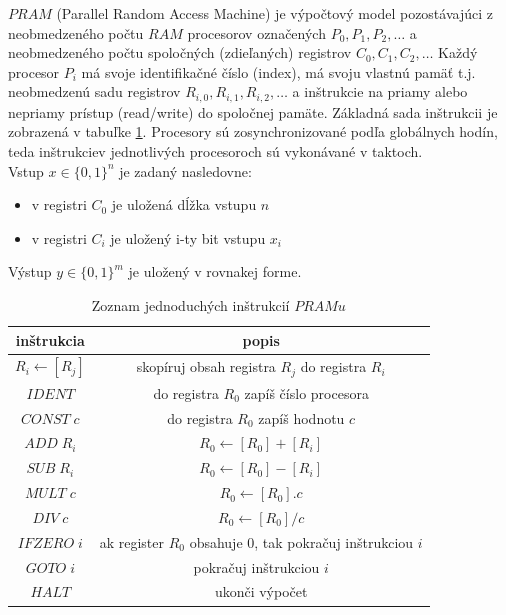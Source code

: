 \begin{definicia}
  $PRAM$ (Parallel Random Access Machine) je výpočtový model
  pozostávajúci z neobmedzeného počtu $RAM$ procesorov označených
  $P_0,P_1,P_2,\dots$ a neobmedzeného počtu spoločných (zdieľaných)
  registrov $C_0,C_1,C_2,\dots$ Každý procesor $P_i$ má svoje
  identifikačné číslo (index), má svoju vlastnú pamäť t.j.
  ne\-ob\-me\-dze\-nú sadu registrov $R_{i,0},R_{i,1},R_{i,2},\dots$
  a inštrukcie na priamy alebo nepriamy prí\-stup (read/write) do
  spoločnej pamäte. Základná sada inštrukcii je zobrazená v tabuľke
  \ref{pram_tab_pram}. Procesory sú zosynchronizované podľa globálnych
  hodín, teda inštrukcie\linebreak v jednotlivých procesoroch sú
  vykonávané v taktoch.
  \\ Vstup $x\in\{ 0,1\}^n$ je zadaný nasledovne:
  \begin{itemize}
    \item v registri $C_0$ je uložená dĺžka vstupu $n$
    \item v registri $C_i$ je uložený i-ty bit vstupu $x_i$
  \end{itemize}
  Výstup $y\in\{ 0,1\}^m$ je uložený v rovnakej forme.
\end{definicia}

\begin{table}[!ht]\label{pram_tab_pram}
 \begin{center}
  \begin{tabular}{|c||c|}
   \hline
   inštrukcia & popis \\  \hline  \hline
   $R_i\leftarrow [R_j]$ & skopíruj obsah registra $R_j$ do registra $R_i$
   \\ \hline
   $IDENT$ & do registra $R_0$ zapíš číslo procesora \\ \hline
   $CONST\; c$ & do registra $R_0$ zapíš hodnotu $c$ \\ \hline
   $ADD\; R_i$ & $R_0\leftarrow [R_0]+[R_i]$ \\ \hline
   $SUB\; R_i$ & $R_0\leftarrow [R_0]-[R_i]$ \\ \hline
   $MULT\; c$ & $R_0\leftarrow [R_0].c$ \\ \hline
   $DIV\; c$ & $R_0\leftarrow [R_0]/c$ \\ \hline
   $IFZERO\; i$ & ak register $R_0$ obsahuje 0, tak pokračuj
   inštrukciou $i$ \\ \hline
   $GOTO\; i$ & pokračuj inštrukciou $i$ \\ \hline
   $HALT$ & ukonči výpočet \\ \hline
  \end{tabular}
 \end{center}
\caption{Zoznam jednoduchých inštrukcií $PRAMu$}
\end{table}


